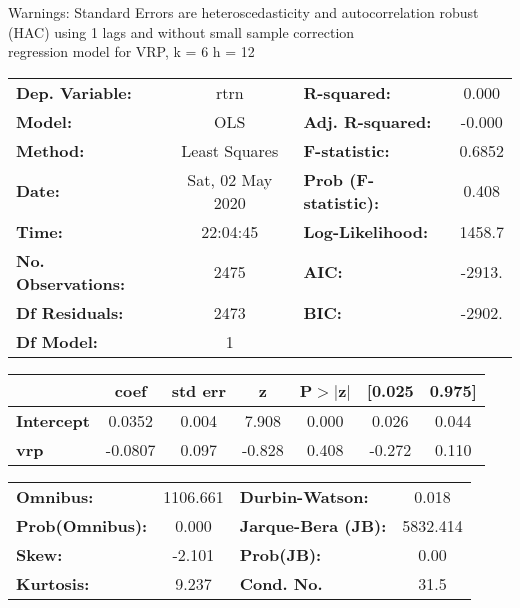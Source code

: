 Warnings: \newline
 [1] Standard Errors are heteroscedasticity and autocorrelation robust (HAC) using 1 lags and without small sample correction\\ 

regression model for VRP, k = 6 h = 12\begin{center}
\begin{tabular}{lclc}
\toprule
\textbf{Dep. Variable:}    &       rtrn       & \textbf{  R-squared:         } &     0.000   \\
\textbf{Model:}            &       OLS        & \textbf{  Adj. R-squared:    } &    -0.000   \\
\textbf{Method:}           &  Least Squares   & \textbf{  F-statistic:       } &    0.6852   \\
\textbf{Date:}             & Sat, 02 May 2020 & \textbf{  Prob (F-statistic):} &    0.408    \\
\textbf{Time:}             &     22:04:45     & \textbf{  Log-Likelihood:    } &    1458.7   \\
\textbf{No. Observations:} &        2475      & \textbf{  AIC:               } &    -2913.   \\
\textbf{Df Residuals:}     &        2473      & \textbf{  BIC:               } &    -2902.   \\
\textbf{Df Model:}         &           1      & \textbf{                     } &             \\
\bottomrule
\end{tabular}
\begin{tabular}{lcccccc}
                   & \textbf{coef} & \textbf{std err} & \textbf{z} & \textbf{P$> |$z$|$} & \textbf{[0.025} & \textbf{0.975]}  \\
\midrule
\textbf{Intercept} &       0.0352  &        0.004     &     7.908  &         0.000        &        0.026    &        0.044     \\
\textbf{vrp}       &      -0.0807  &        0.097     &    -0.828  &         0.408        &       -0.272    &        0.110     \\
\bottomrule
\end{tabular}
\begin{tabular}{lclc}
\textbf{Omnibus:}       & 1106.661 & \textbf{  Durbin-Watson:     } &    0.018  \\
\textbf{Prob(Omnibus):} &   0.000  & \textbf{  Jarque-Bera (JB):  } & 5832.414  \\
\textbf{Skew:}          &  -2.101  & \textbf{  Prob(JB):          } &     0.00  \\
\textbf{Kurtosis:}      &   9.237  & \textbf{  Cond. No.          } &     31.5  \\
\bottomrule
\end{tabular}
\end{center}


